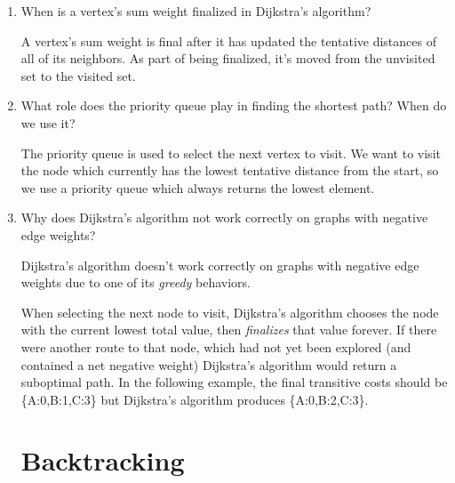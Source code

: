\documentclass[11pt]{article}
\newenvironment{answer}{\large\lstset{basicstyle=\large}\color{white}}{}
\newenvironment{answer}{\large\lstset{basicstyle=\large}\color{red}}{}
\begin{document}
\begin{enumerate}
\item When is a vertex's sum weight finalized in Dijkstra's algorithm?

    \begin{answer}
    A vertex's sum weight is final after it has updated the tentative distances
    of all of its neighbors. As part of being finalized, it's moved from the
    unvisited set to the visited set.
    \end{answer}

\item What role does the priority queue play in finding the shortest path?
      When do we use it?

    \begin{answer}
    The priority queue is used to select the next vertex to visit. We want to
    visit the node which currently has the lowest tentative distance from the
    start, so we use a priority queue which always returns the lowest element.
    \end{answer}

\item Why does Dijkstra's algorithm not work correctly on graphs with negative
      edge weights?

    \begin{answer}
    Dijkstra's algorithm doesn't work correctly on graphs with negative edge
    weights due to one of its {\em greedy} behaviors.

    When selecting the next node to visit, Dijkstra's algorithm chooses the
    node with the current lowest total value, then {\em finalizes} that value
    forever. If there were another route to that node, which had not yet been
    explored (and contained a net negative weight) Dijkstra's algorithm would
    return a suboptimal path. In the following example, the final transitive
    costs should be \{A:0,B:1,C:3\} but Dijkstra's algorithm produces
    \{A:0,B:2,C:3\}.

    \end{answer}

\section*{Backtracking}


\end{enumerate}
\end{document}
